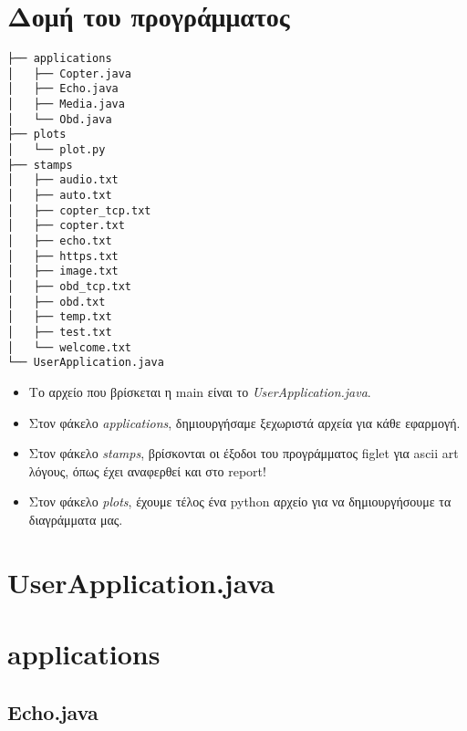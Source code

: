 \documentclass[hidelinks, 12pt, a4paper]{article}
\begin{document}
\sloppy %




\pagebreak
\tableofcontents
\pagebreak


\section{Δομή του προγράμματος}

\vspace{1cm}

\begin{verbatim}
├── applications
│   ├── Copter.java
│   ├── Echo.java
│   ├── Media.java
│   └── Obd.java
├── plots
│   └── plot.py
├── stamps
│   ├── audio.txt
│   ├── auto.txt
│   ├── copter_tcp.txt
│   ├── copter.txt
│   ├── echo.txt
│   ├── https.txt
│   ├── image.txt
│   ├── obd_tcp.txt
│   ├── obd.txt
│   ├── temp.txt
│   ├── test.txt
│   └── welcome.txt
└── UserApplication.java
\end{verbatim}


\begin{itemize}
    \item Το αρχείο που βρίσκεται η main είναι το \emph{UserApplication.java}.
    \item Στον φάκελο \emph{applications}, δημιουργήσαμε ξεχωριστά αρχεία για κάθε εφαρμογή.
    \item Στον φάκελο \emph{stamps}, βρίσκονται οι έξοδοι του προγράμματος figlet για ascii art λόγους, όπως έχει αναφερθεί και στο report!
    \item Στον φάκελο \emph{plots}, έχουμε τέλος ένα python αρχείο για να δημιουργήσουμε τα διαγράμματα μας.
\end{itemize}


\pagebreak

\section{UserApplication.java}



\section{applications}

\subsection{Echo.java}
\end{document}
